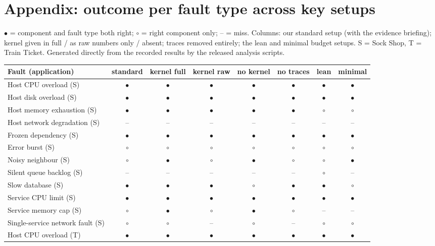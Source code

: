 \section*{Appendix: outcome per fault type across key setups}
\label{sec:appendix-families}

\newcommand{\Yes}{$\bullet$}
\newcommand{\Svc}{$\circ$}
\newcommand{\No}{--}

$\bullet$ = component and fault type both right; $\circ$ = right component only;
-- = miss. Columns: our standard setup (with the evidence briefing); kernel given in
full / as raw numbers only / absent; traces removed entirely; the lean and minimal
budget setups. S = Sock Shop, T = Train Ticket. Generated directly from the recorded
results by the released analysis scripts.

\begin{table}[h]
\centering
\small
\begin{tabular}{lccccccc}
\toprule
Fault (application) & standard & kernel full & kernel raw & no kernel & no traces & lean & minimal \\
\midrule
Host CPU overload (S) & \Yes & \Yes & \Yes & \Yes & \Yes & \Yes & \Yes \\
Host disk overload (S) & \Yes & \Yes & \Yes & \Yes & \Yes & \Yes & \Yes \\
Host memory exhaustion (S) & \Yes & \Yes & \Yes & \Yes & \Yes & \Svc & \Svc \\
Host network degradation (S) & \No & \No & \No & \No & \No & \No & \No \\
Frozen dependency (S) & \Yes & \Yes & \Yes & \Yes & \Yes & \Yes & \Yes \\
Error burst (S) & \Svc & \Svc & \Svc & \Svc & \Svc & \Svc & \Svc \\
Noisy neighbour (S) & \Svc & \Yes & \Svc & \Yes & \Svc & \Svc & \Yes \\
Silent queue backlog (S) & \No & \No & \No & \No & \No & \Svc & \No \\
Slow database (S) & \Yes & \Yes & \Yes & \Svc & \Yes & \Yes & \Svc \\
Service CPU limit (S) & \Yes & \Yes & \Yes & \Yes & \Yes & \Yes & \Yes \\
Service memory cap (S) & \Svc & \Yes & \Svc & \Yes & \Svc & \No & \No \\
Single-service network fault (S) & \Svc & \Svc & \No & \Svc & \No & \Svc & \Svc \\
Host CPU overload (T) & \Yes & \Yes & \Yes & \Yes & \Yes & \Yes & \Yes \\

\end{tabular}
\end{table}
